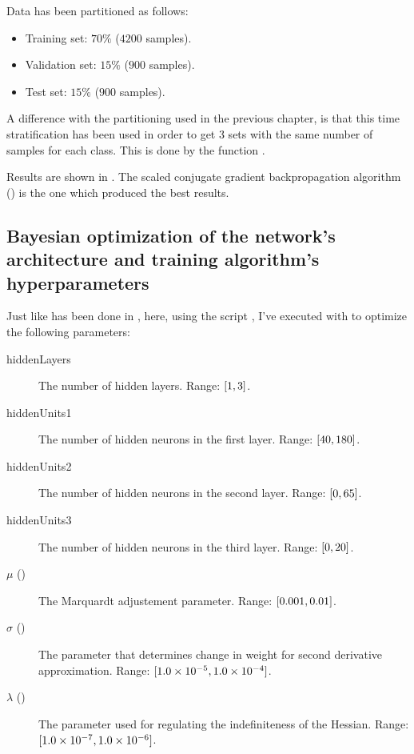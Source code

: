 Data has been partitioned as follows:
\begin{itemize}
\item Training set: \(70\%\) (\(4200\) samples).
\item Validation set: \(15\%\) (\(900\) samples).
\item Test set: \(15\%\) (\(900\) samples).
\end{itemize}
A difference with the partitioning used in the previous chapter, is that this
time stratification has been used in order to get 3 sets with the same number
of samples for each class. This is done by the function
.

Results are shown in . The scaled conjugate
gradient backpropagation algorithm () is the one which produced
the best results.



\subsection{Bayesian optimization of the network's architecture and training
algorithm's hyperparameters}\label{subsec:activitybayesopt}

Just like has been done in , here, using the script
, I've executed  with  to optimize the following parameters:

\begin{description}
\item[hiddenLayers] The number of hidden layers. Range:
	\(\interval{1}{3}\).
\item[hiddenUnits1] The number of hidden neurons in the first layer. Range:
	\(\interval{40}{180}\).
\item[hiddenUnits2] The number of hidden neurons in the second layer. Range:
	\(\interval{0}{65}\).
\item[hiddenUnits3] The number of hidden neurons in the third layer. Range:
	\(\interval{0}{20}\).
\item[\(\mu\) ()] The Marquardt adjustement parameter. Range:
	\(\interval{0.001}{0.01}\).
\item[\(\sigma\) ()] The parameter that determines change in weight
	for second derivative approximation. Range:
	\(\interval{\num{1.0e-5}}{\num{1.0e-4}}\).
\item[\(\lambda\) ()] The parameter used for regulating the
	indefiniteness of the Hessian. Range:
	\(\interval{\num{1.0e-7}}{\num{1.0e-6}}\).
\end{description}

